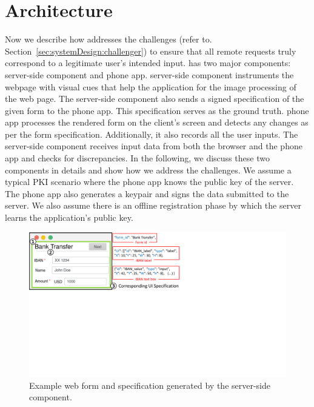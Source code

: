 \section{\sysname Architecture} \label{sec:hardenUI}

 Now we describe how \sysname addresses the challenges (refer to. Section~\ref{sec:systemDesign:challenger}) to ensure that all remote requests truly correspond to a legitimate user's intended input. \sysname has two major components: \name server-side component and \name phone app. \name server-side component instruments the webpage with visual cues that help the \name application for the image processing of the web page. The server-side component also sends a signed specification of the given form to the phone app. This specification serves as the ground truth. \name phone app processes the rendered form on the client's screen and detects any changes as per the form specification. Additionally, it also records all the user inputs. The \name server-side component receives input data from both the browser and the phone app and checks for discrepancies. In the following, we discuss these two components in details and show how we address the challenges. We assume a typical PKI scenario where the phone app knows the public key of the server. The phone app also generates a keypair and signs the data submitted to the server. We also assume there is an offline registration phase by which the server learns the \sysname application's public key.

\begin{figure}[t]
	\centering
\includegraphics[trim={0 11.5cm 14cm 0},clip, width=0.8\linewidth]{chapters/IntegriScreen/newImg/runningExample.pdf} 
	\caption[Example web form and specification generated by the \name server-side component]{Example web form and specification generated by the \name server-side component.}
	\label{fig:runningExample}
\end{figure}



